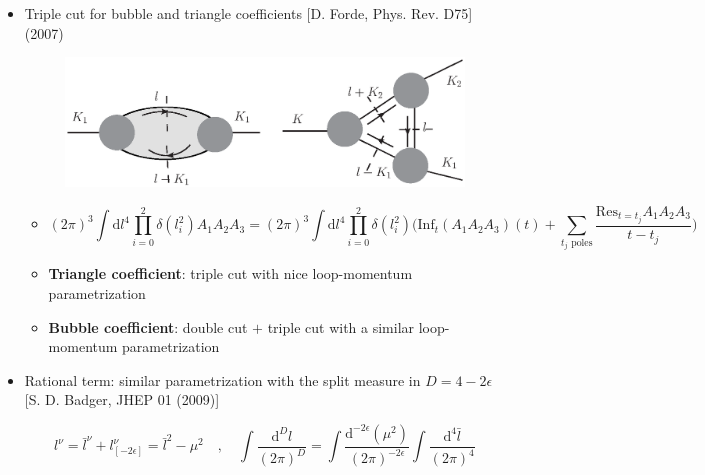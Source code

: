 \documentclass[english]{beamer}
\newcommand{\dd}{\textrm{d}}
\newcommand{\res}{\mathrm{Res}}
\begin{document}
\begin{frame}[shrink=20]
\begin{itemize}
\begin{columns}
\begin{column}{0.7\textwidth}
\begin{itemize}
\end{itemize}

\end{column}
\end{columns}

\item<4-> Triple cut for bubble and triangle coefficients
\tiny\color{blue}
[D. Forde, Phys. Rev. D75]
(2007)
\color{black}\normalsize
\begin{figure}[h]
  \centering
  \includegraphics[width=0.5\linewidth]{triple_cut.eps}
\end{figure}
\begin{itemize}

\item<4->[]
\begin{equation*}
(2\pi)^3\int\dd l^4 \prod_{i=0}^2 \delta(l_i^2) A_1A_2A_3 = 
(2\pi)^3\int\dd l^4 \prod_{i=0}^2 \delta(l_i^2)\Big(\mathrm{Inf}_t(A_1A_2A_3)(t) + \sum_{\textrm{$t_j$ poles}}\frac{\res_{t = t_j}A_1 A_2 A_3}{t-t_j}\Big)
\end{equation*}

\item<4-> \textbf{Triangle coefficient}: triple cut with nice loop-momentum parametrization 
\item<5-> \textbf{Bubble coefficient}: double cut $+$ triple cut with a similar loop-momentum parametrization
\end{itemize}

\item<6-> Rational term: similar parametrization with the split measure in $D=4-2\epsilon$ \tiny\color{blue}[S. D. Badger, JHEP 01 (2009)]\color{black}\normalsize

\begin{equation*}
l^\nu = \bar{l}^\nu + l_{[-2\epsilon]}^\nu = \bar{l}^2 - \mu^2
\quad,\quad
\int\frac{\dd^D l}{(2\pi)^D} = 
\int\frac{\dd^{-2\epsilon}(\mu^2)}{(2\pi)^{-2\epsilon}}\int\frac{\dd^4 \bar{l}}{(2\pi)^4}
\end{equation*}

\end{itemize}

\end{frame}
\end{document}
